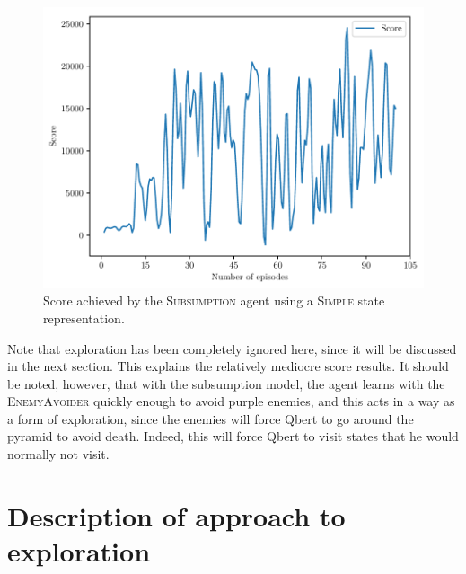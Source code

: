 \documentclass[a4paper,titlepage]{article}
\begin{document}
	\begin{figure}[!htb]
		\centering
		\includegraphics[width=\columnwidth]{plots/subsumption_generalization.pdf}
		\caption
		{Score achieved by the \textsc{Subsumption} agent using a \textsc{Simple} state representation.}
		\label{fig:subsumption_generalization}
	\end{figure}

	Note that exploration has been completely ignored here, since it will be discussed in the next section. This explains the relatively mediocre score results. It should be noted, however, that with the subsumption model, the agent learns with the \textsc{EnemyAvoider} quickly enough to avoid purple enemies, and this acts in a way as a form of exploration, since the enemies will force Qbert to go around the pyramid to avoid death. Indeed, this will force Qbert to visit states that he would normally not visit.
	
	\section{Description of approach to exploration}
	
\end{document}
